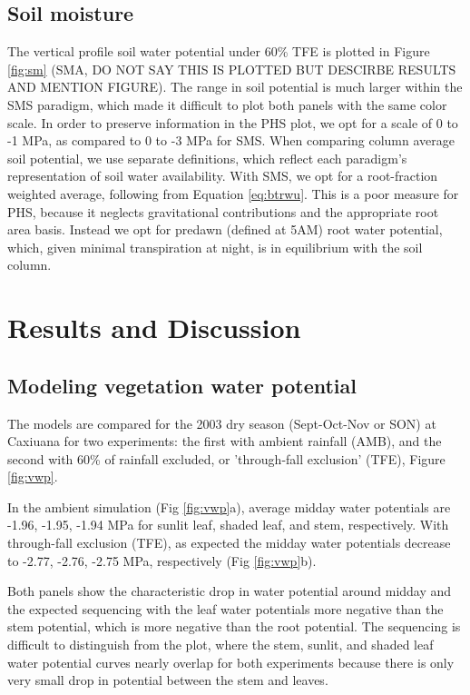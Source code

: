 \documentclass[draft,linenumbers]{agujournal}
\begin{document}
\subsection{Soil moisture}
    The vertical profile soil water potential under 60\% TFE is plotted in Figure \ref{fig:sm} (SMA, DO NOT SAY THIS IS PLOTTED BUT DESCIRBE RESULTS AND MENTION FIGURE).
    The range in soil potential is much larger within the SMS paradigm, which made it difficult to plot both panels with the same color scale.
    In order to preserve information in the PHS plot, we opt for a scale of 0 to -1 MPa, as compared to 0 to -3 MPa for SMS.
    When comparing column average soil potential, we use separate definitions, which reflect each paradigm's representation of soil water availability.
    With SMS, we opt for a root-fraction weighted average, following from Equation \ref{eq:btrwu}.
    This is a poor measure for PHS, because it neglects gravitational contributions and the appropriate root area basis. 
    Instead we opt for predawn (defined at 5AM) root water potential, which, given minimal transpiration at night, is in equilibrium with the soil column. 
    
\section{Results and Discussion}
\subsection{Modeling vegetation water potential}
    
    The models are compared for the 2003 dry season (Sept-Oct-Nov or SON) at Caxiuana for two experiments: the first with ambient rainfall (AMB), and the second with 60\% of rainfall excluded, or 'through-fall exclusion' (TFE), Figure \ref{fig:vwp}. 
    
    In the ambient simulation (Fig \ref{fig:vwp}a), average midday water potentials are -1.96, -1.95, -1.94 MPa for sunlit leaf, shaded leaf, and stem, respectively. With through-fall exclusion (TFE), as expected the midday water potentials decrease to -2.77, -2.76, -2.75 MPa, respectively (Fig \ref{fig:vwp}b).
    
    Both panels show the characteristic drop in water potential around midday and the expected sequencing with the leaf water potentials more negative than the stem potential, which is more negative than the root potential. The sequencing is difficult to distinguish from the plot, where the stem, sunlit, and shaded leaf water potential curves nearly overlap for both experiments because there is only very small drop in potential between the stem and leaves. 
    
\end{document}
